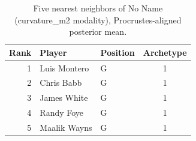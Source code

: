 \begin{table}[htbp]
  \centering\small
  \begin{tabular}{rllc}
    \toprule
    Rank & Player & Position & Archetype \\
    \midrule
    1 & Luis Montero & G & 1 \\
    2 & Chris Babb & G & 1 \\
    3 & James White & G & 1 \\
    4 & Randy Foye & G & 1 \\
    5 & Maalik Wayns & G & 1 \\
    \bottomrule
  \end{tabular}
  \caption{Five nearest neighbors of No Name (curvature_m2 modality), Procrustes-aligned posterior mean.}
  \label{tab:No_Name_neighbors_curvature_m2}
\end{table}

